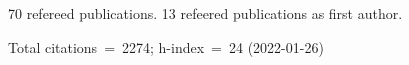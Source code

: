 70 refereed publications. 13 refeered publications as first author.

Total citations~=~2274; h-index~=~24 (2022-01-26)